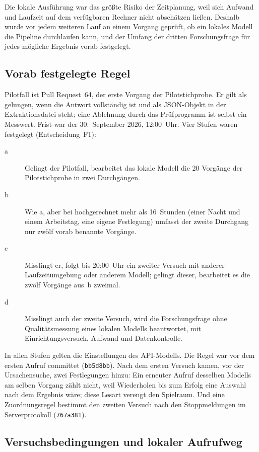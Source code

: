 \documentclass[11pt,a4paper]{report}
\begin{document}
Die lokale Ausführung war das größte Risiko der Zeitplanung, weil sich
Aufwand und Laufzeit auf dem verfügbaren Rechner nicht abschätzen
ließen. Deshalb wurde vor jedem weiteren Lauf an einem Vorgang geprüft,
ob ein lokales Modell die Pipeline durchlaufen kann, und der Umfang der
dritten Forschungsfrage für jedes mögliche Ergebnis vorab festgelegt.

\subsection{Vorab festgelegte Regel}
\label{subsec:pilot-regel}

Pilotfall ist Pull Request~64, der erste Vorgang der Pilotstichprobe. Er
gilt als gelungen, wenn die Antwort vollständig ist und als JSON-Objekt
in der Extraktionsdatei steht; eine Ablehnung durch das Prüfprogramm ist
selbst ein Messwert. Frist war der 30.~September 2026, 12:00~Uhr. Vier
Stufen waren festgelegt (Entscheidung~F1):

\begin{description}
  \item[a] Gelingt der Pilotfall, bearbeitet das lokale Modell die 20
    Vorgänge der Pilotstichprobe in zwei Durchgängen.
  \item[b] Wie a, aber bei hochgerechnet mehr als 16~Stunden (einer
    Nacht und einem Arbeitstag, eine eigene Festlegung) umfasst der
    zweite Durchgang nur zwölf vorab benannte Vorgänge.
  \item[c] Misslingt er, folgt bis 20:00~Uhr ein zweiter Versuch mit
    anderer Laufzeitumgebung oder anderem Modell; gelingt dieser,
    bearbeitet es die zwölf Vorgänge aus~b zweimal.
  \item[d] Misslingt auch der zweite Versuch, wird die Forschungsfrage
    ohne Qualitätsmessung eines lokalen Modells beantwortet, mit
    Einrichtungsversuch, Aufwand und Datenkontrolle.
\end{description}

In allen Stufen gelten die Einstellungen des API-Modells. Die Regel war
vor dem ersten Aufruf committet (\texttt{bb5d8bb}). Nach dem ersten
Versuch kamen, vor der Ursachensuche, zwei Festlegungen hinzu: Ein
erneuter Aufruf desselben Modells am selben Vorgang zählt nicht, weil
Wiederholen bis zum Erfolg eine Auswahl nach dem Ergebnis wäre; diese
Lesart verengt den Spielraum. Und eine Zuordnungsregel bestimmt den
zweiten Versuch nach den Stoppmeldungen im Serverprotokoll
(\texttt{767a381}).

\subsection{Versuchsbedingungen und lokaler Aufrufweg}
\label{subsec:pilot-bedingungen}
\label{subsec:impl-lokal}
\end{document}
